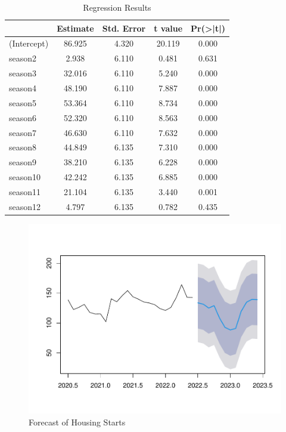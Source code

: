 \documentclass[]{book}
\theoremstyle{definition}
\theoremstyle{definition}
\theoremstyle{definition}
\theoremstyle{remark}
\begin{document}
\begin{table}[t]

\caption{\label{tab:ch5-table3}Regression Results}
\centering
\begin{tabular}{lcccc}
\toprule
  & Estimate & Std. Error & t value & Pr(>|t|)\\
\midrule
(Intercept) & 86.925 & 4.320 & 20.119 & 0.000\\
season2 & 2.938 & 6.110 & 0.481 & 0.631\\
season3 & 32.016 & 6.110 & 5.240 & 0.000\\
season4 & 48.190 & 6.110 & 7.887 & 0.000\\
season5 & 53.364 & 6.110 & 8.734 & 0.000\\
\addlinespace
season6 & 52.320 & 6.110 & 8.563 & 0.000\\
season7 & 46.630 & 6.110 & 7.632 & 0.000\\
season8 & 44.849 & 6.135 & 7.310 & 0.000\\
season9 & 38.210 & 6.135 & 6.228 & 0.000\\
season10 & 42.242 & 6.135 & 6.885 & 0.000\\
\addlinespace
season11 & 21.104 & 6.135 & 3.440 & 0.001\\
season12 & 4.797 & 6.135 & 0.782 & 0.435\\
\bottomrule
\end{tabular}
\end{table}

\begin{figure}

{\centering \includegraphics[width=0.8\linewidth]{bookdown-demo_files/figure-latex/ch5-figure5-1} 

}

\caption{Forecast of Housing Starts}\label{fig:ch5-figure5}
\end{figure}
\end{document}
